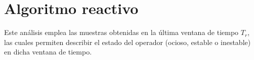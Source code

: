 


\section{Algoritmo reactivo}


\normalsize{Este análisis emplea las muestras obtenidas en la última ventana de tiempo $T_r$, las cuales permiten describir el estado del operador (ocioso, estable o inestable) en dicha ventana de tiempo.}

